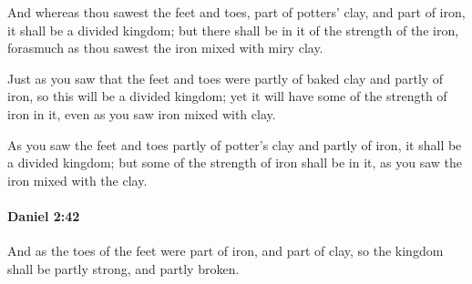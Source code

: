 			\begin{versebox}
					\item[BHS] 
					\item[LXX] 
					\item[ASV] And whereas thou sawest the feet and toes, part of potters' clay, and part of iron, it shall be a divided kingdom; but there shall be in it of the strength of the iron, forasmuch as thou sawest the iron mixed with miry clay.
					\item[NIV] Just as you saw that the feet and toes were partly of baked clay and partly of iron, so this will be a divided kingdom; yet it will have some of the strength of iron in it, even as you saw iron mixed with clay.
					\item[NRSV] As you saw the feet and toes partly of potter’s clay and partly of iron, it shall be a divided kingdom; but some of the strength of iron shall be in it, as you saw the iron mixed with the clay.
			\end{versebox}

		\paragraph{Daniel 2:42} %
			\label{DANIEL-2-42}

			And as the toes of the feet were part of iron, and part of clay, so the kingdom shall be partly strong, and partly broken.

